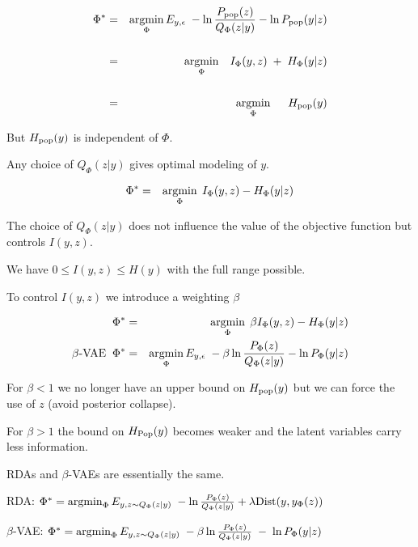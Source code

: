 {

\begin{eqnarray*}
\Phi^* & = & \operatorname*{argmin}_\Phi E_{y,\epsilon}\;-\ln \frac{P_{\mathrm{pop}}(z)}{Q_\Phi(z|y)} - \ln P_{\mathrm{pop}}(y|z) \\
\\
& = & \operatorname*{argmin}_\Phi \;\;\;I_\Phi(y,z)\; + \; H_\Phi(y|z) \\
\\
& = & \operatorname*{argmin}_\Phi \;\;\;\;\; H_{\mathrm{pop}}(y)
\end{eqnarray*}

\vfill
But $H_{\mathrm{pop}}(y)$ is independent of $\Phi$.

\vfill
Any choice of $Q_\Phi(z|y)$ gives optimal modeling of $y$.


\begin{eqnarray*}
\Phi^* & = & \operatorname*{argmin}_\Phi \; I_\Phi(y,z) - H_\Phi(y|z)
\end{eqnarray*}

\vfill
The choice of $Q_\Phi(z|y)$ does not influence the value of the objective function but controls $I(y,z)$.

\vfill
We have $0 \leq I(y,z) \leq H(y)$ with the full range possible.


To control $I(y,z)$ we introduce a weighting $\beta$

\begin{eqnarray*}
\Phi^* & = & \operatorname*{argmin}_\Phi \; \beta I_\Phi(y,z) - H_\Phi(y|z) \\
\mbox{$\beta$-VAE}\;\; \Phi^* & = & \operatorname*{argmin}_\Phi E_{y,\epsilon}\;-\beta \ln \frac{P_\Phi(z)}{Q_\Phi(z|y)} - \ln P_\Phi(y|z)
\end{eqnarray*}

\vfill
For $\beta < 1$ we no longer have an upper bound on $H_{\mathrm{pop}}(y)$ but we can force the use of $z$ (avoid posterior collapse).

\vfill
For $\beta > 1$ the bound on $H_{\mathrm{Pop}}(y)$ becomes weaker and the latent variables carry less information.


RDAs and $\beta$-VAEs are essentially the same.

\vfill
RDA: $\Phi^* = \operatorname*{argmin}_\Phi E_{y,z \sim Q_\Phi(z|y)}\;-\ln \frac{P_\Phi(z)}{Q_\Phi(z|y)} + \lambda \mathrm{Dist}(y,y_\Phi(z))$

\vfill
$\beta$-VAE: $\Phi^* = \operatorname*{argmin}_\Phi E_{y,z \sim Q_\Phi(z|y)}\;-\beta \ln \frac{P_\Phi(z)}{Q_\Phi(z|y)} \;-\;\ln P_\Phi(y|z)$

}
